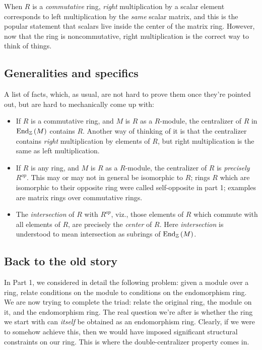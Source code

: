 \documentclass[a4paper]{amsart}
\newcommand{\Endo}[2]{\text{End}_{#1}\left(#2\right)}
\begin{document}
When $R$ is a {\em commutative} ring, {\em right} multiplication by a
scalar element corresponds to left multiplication by the {\em same}
scalar matrix, and this is the popular statement that scalars live
inside the center of the matrix ring. However, now that the ring is
noncommutative, right multiplication is the correct way to think of
things.

\subsection{Generalities and specifics}

A list of facts, which, as usual, are not hard to prove them once
they're pointed out, but are hard to mechanically come up with:

\begin{itemize}

\item If $R$ is a commutative ring, and $M$ is $R$ as a $R$-module,
  the centralizer of $R$ in $\Endo{\Z}{M}$ contains $R$. Another
  way of thinking of it is that the centralizer contains {\em right}
  multiplication by elements of $R$, but right multiplication is the
  same as left multiplication.

\item If $R$ is any ring, and $M$ is $R$ as a $R$-module, the
  centralizer of $R$ is {\em precisely} $R^{op}$. This may or may not
  in general be isomorphic to $R$; rings $R$ which are isomorphic to
  their opposite ring were called self-opposite in part 1; examples
  are matrix rings over commutative rings.

\item The {\em intersection} of $R$ with $R^{op}$, viz.,  those elements
  of $R$ which commute with all elements of $R$, are precisely the
  {\em center} of $R$. Here {\em intersection} is understood to mean
  intersection as subrings of $\Endo{\Z}{M}$.
\end{itemize}

\subsection{Back to the old story}

In Part 1, we considered in detail the following problem: given a
module over a ring, relate conditions on the module to conditions on
the endomorphism ring. We are now trying to complete the triad: relate
the original ring, the module on it, and the endomorphism ring. The
real question we're after is whether the ring we start with can {\em
  itself} be obtained as an endomorphism ring. Clearly, if we were to
somehow achieve this, then we would have imposed significant
structural constraints on our ring. This is where the
double-centralizer property comes in.
\end{document}
